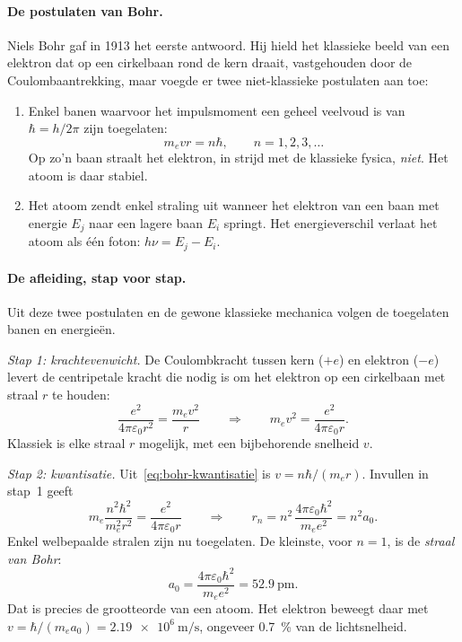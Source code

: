 \paragraph{De postulaten van Bohr.}
Niels Bohr gaf in 1913 het eerste antwoord. Hij hield het klassieke beeld van een elektron dat op een cirkelbaan rond de kern draait, vastgehouden door de Coulombaantrekking, maar voegde er twee niet-klassieke postulaten aan toe:
\begin{enumerate}
\item Enkel banen waarvoor het impulsmoment een geheel veelvoud is van $\hbar = h/2\pi$ zijn toegelaten:
\begin{equation}
m_e v r = n\hbar, \qquad n=1,2,3,\ldots
\label{eq:bohr-kwantisatie}
\end{equation}
Op zo'n baan straalt het elektron, in strijd met de klassieke fysica, \emph{niet}. Het atoom is daar stabiel.
\item Het atoom zendt enkel straling uit wanneer het elektron van een baan met energie $E_j$ naar een lagere baan $E_i$ springt. Het energieverschil verlaat het atoom als één foton: $h\nu = E_j - E_i$.
\end{enumerate}

\paragraph{De afleiding, stap voor stap.}
Uit deze twee postulaten en de gewone klassieke mechanica volgen de toegelaten banen en energieën.

\emph{Stap 1: krachtevenwicht.} De Coulombkracht tussen kern ($+e$) en elektron ($-e$) levert de centripetale kracht die nodig is om het elektron op een cirkelbaan met straal $r$ te houden:
\[
\frac{e^2}{4\pi\varepsilon_0 r^2} = \frac{m_e v^2}{r}
\qquad\Longrightarrow\qquad
m_e v^2 = \frac{e^2}{4\pi\varepsilon_0 r}.
\]
Klassiek is elke straal $r$ mogelijk, met een bijbehorende snelheid $v$.

\emph{Stap 2: kwantisatie.} Uit~\eqref{eq:bohr-kwantisatie} is $v = n\hbar/(m_e r)$. Invullen in stap~1 geeft
\[
m_e \frac{n^2\hbar^2}{m_e^2 r^2} = \frac{e^2}{4\pi\varepsilon_0 r}
\qquad\Longrightarrow\qquad
r_n = n^2\,\frac{4\pi\varepsilon_0\hbar^2}{m_e e^2} = n^2 a_0 .
\]
Enkel welbepaalde stralen zijn nu toegelaten. De kleinste, voor $n=1$, is de \emph{straal van Bohr}:
\[
a_0 = \frac{4\pi\varepsilon_0\hbar^2}{m_e e^2} = \SI{52.9}{\pico\metre}.
\]
Dat is precies de grootteorde van een atoom. Het elektron beweegt daar met $v = \hbar/(m_e a_0) = \SI{2.19e6}{\metre\per\second}$, ongeveer \SI{0.7}{\percent} van de lichtsnelheid.

